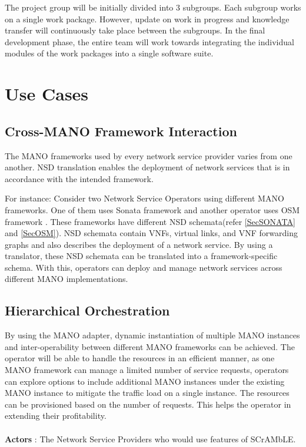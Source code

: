 The project group will be initially divided into 3 subgroups. Each subgroup works on a single work package. However, update on work in progress and knowledge transfer will continuously take place between the subgroups. In the final development phase, the entire team will work towards integrating the individual modules of the work packages into a single software suite.


\section{Use Cases}

\subsection{Cross-MANO Framework Interaction}
The MANO frameworks used by every network service provider varies from one another. NSD translation enables the deployment of network services that is in accordance with the intended framework.

For instance: Consider two Network Service Operators using different MANO frameworks. One of them uses Sonata framework \cite{draxler2017sonata} and another operator uses OSM framework \cite{ersue2013etsi}. These frameworks have different NSD schemata(refer \ref{SecSONATA} and \ref{SecOSM}). NSD schemata contain VNFs, virtual links, and VNF forwarding graphs and also describes the deployment of a network service. By using a translator, these NSD schemata can be translated into a framework-specific schema. With this, operators can deploy and manage network services across different MANO implementations.

\subsection{Hierarchical Orchestration}
By using the MANO adapter, dynamic instantiation of multiple MANO instances and inter-operability between different MANO frameworks can be achieved. The operator will be able to handle the resources in an efficient manner, as one MANO framework can manage a limited number of service requests, operators can explore options to include additional MANO instances under the existing MANO instance to mitigate the traffic load on a single instance. The resources can be provisioned based on the number of requests. This helps the operator in extending their profitability.
\\
\\
\textbf{Actors} : The Network Service Providers who would use features of SCrAMbLE.

